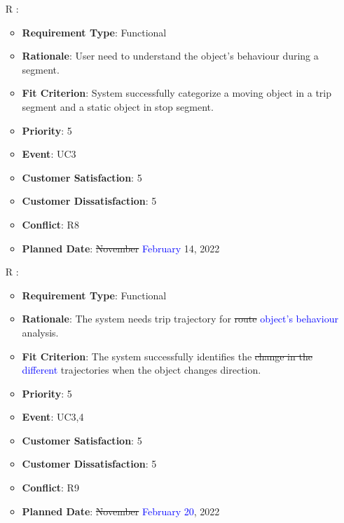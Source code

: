 \documentclass[12pt, titlepage]{article}
\newcounter{reqnum} %
\begin{document}
\begin{itemize}
\item[R\refstepcounter{reqnum}\thereqnum
\label{R_Outputs_2}:] 
\begin{itemize}
    \item \textbf{Requirement Type}: Functional
    \item \textbf{Rationale}: User need to understand the object's behaviour during a segment.
    \item \textbf{Fit Criterion}: System successfully categorize a moving object in a trip segment and a static object in stop segment.
    \item \textbf{Priority}: 5
    \item \textbf{Event}: UC3
    \item \textbf{Customer Satisfaction}: 5
    \item \textbf{Customer Dissatisfaction}: 5
    \item \textbf{Conflict}: R8
    \item \textbf{Planned Date}: \sout{November} \textcolor{blue}{February} 14, 2022
\end{itemize}

\item[R\refstepcounter{reqnum}\thereqnum
\label{R_Inputs_1}:] 
\begin{itemize}
    \item \textbf{Requirement Type}: Functional
    \item \textbf{Rationale}: The system needs trip trajectory for \sout{route} \textcolor{blue}{object's behaviour} analysis. 
    \item \textbf{Fit Criterion}: The system successfully identifies the \sout{change in the} \textcolor{blue}{different} trajectories when the object changes direction. 
    \item \textbf{Priority}: 5
    \item \textbf{Event}: UC3,4
    \item \textbf{Customer Satisfaction}: 5
    \item \textbf{Customer Dissatisfaction}: 5
    \item \textbf{Conflict}: R9
    \item \textbf{Planned Date}: \sout{November} \textcolor{blue}{February 20}, 2022
\end{itemize}


\end{itemize}
\end{document}
